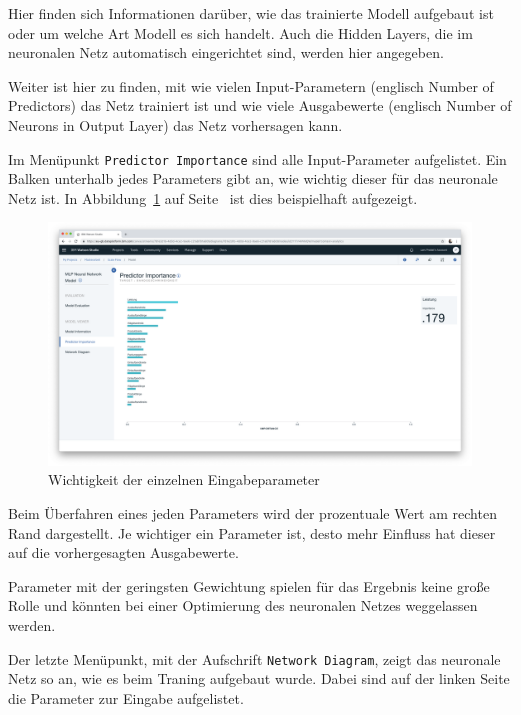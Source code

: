 Hier finden sich Informationen darüber, wie das trainierte Modell aufgebaut ist oder um welche Art Modell es sich
handelt. Auch die Hidden Layers, die im neuronalen Netz automatisch eingerichtet sind, werden hier angegeben.

Weiter ist hier zu finden, mit wie vielen Input-Parametern (englisch Number of Predictors) das Netz trainiert ist und wie
viele Ausgabewerte (englisch Number of Neurons in Output Layer) das Netz vorhersagen kann.

Im Menüpunkt \texttt{Predictor Importance} sind alle Input-Parameter aufgelistet. Ein Balken unterhalb jedes Parameters
gibt an, wie wichtig dieser für das neuronale Netz ist. In Abbildung~\ref{fig:umsetzung_model_predictor} auf
Seite~\pageref{fig:umsetzung_model_predictor} ist dies beispielhaft aufgezeigt.

\begin{figure}[h]
    \centering
    \includegraphics[width=\textwidth]{images/kapitel_3/model_predictor.png}
    \caption{Wichtigkeit der einzelnen Eingabeparameter}
    \label{fig:umsetzung_model_predictor}
\end{figure}

Beim Überfahren eines jeden Parameters wird der prozentuale Wert am rechten Rand dargestellt. Je wichtiger ein Parameter
ist, desto mehr Einfluss hat dieser auf die vorhergesagten Ausgabewerte.

Parameter mit der geringsten Gewichtung spielen für das Ergebnis keine große Rolle und könnten bei einer Optimierung des
neuronalen Netzes weggelassen werden.

Der letzte Menüpunkt, mit der Aufschrift \texttt{Network Diagram}, zeigt das neuronale Netz so an, wie es beim Traning
aufgebaut wurde. Dabei sind auf der linken Seite die Parameter zur Eingabe aufgelistet.

